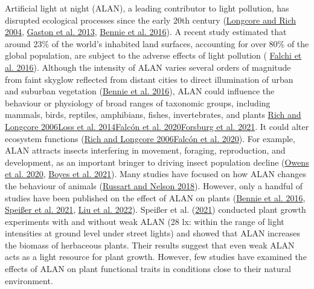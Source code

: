 \documentclass[
  12pt,
  letterpaper,
  DIV=11,
  numbers=noendperiod]{scrartcl}
\providecommand{\DIFaddtex}[1]{{\protect\color{blue}\uwave{#1}}} %
\providecommand{\DIFaddbegin}{} %
\providecommand{\DIFaddend}{} %
\providecommand{\DIFdelbegin}{} %
\providecommand{\DIFdelend}{} %
\providecommand{\DIFadd}[1]{\texorpdfstring{\DIFaddtex{#1}}{#1}} %
\newcommand{\DIFscaledelfig}{0.5}
\newlength{\DIFdelgraphicswidth} %
\newlength{\DIFdelgraphicsheight} %
\newcommand{\DIFaddincludegraphics}[2][]{{\color{blue}\fbox{\DIFOincludegraphics[#1]{#2}}}} %
\newcommand{\DIFdelincludegraphics}[2][]{%
\sbox{\DIFdelgraphicsbox}{\DIFOincludegraphics[#1]{#2}}%
\settoboxwidth{\DIFdelgraphicswidth}{\DIFdelgraphicsbox} %
\settoboxtotalheight{\DIFdelgraphicsheight}{\DIFdelgraphicsbox} %
\scalebox{\DIFscaledelfig}{%
\parbox[b]{\DIFdelgraphicswidth}{\usebox{\DIFdelgraphicsbox}\\[-\baselineskip] \rule{\DIFdelgraphicswidth}{0em}}\llap{\resizebox{\DIFdelgraphicswidth}{\DIFdelgraphicsheight}{%
\setlength{\unitlength}{\DIFdelgraphicswidth}%
\begin{picture}(1,1)%
\thicklines\linethickness{2pt} %
{\color[rgb]{1,0,0}\put(0,0){\framebox(1,1){}}}%
{\color[rgb]{1,0,0}\put(0,0){\line( 1,1){1}}}%
{\color[rgb]{1,0,0}\put(0,1){\line(1,-1){1}}}%
\end{picture}%
}\hspace*{3pt}}} %
} %
\DeclareRobustCommand{\DIFaddbegin}{\DIFOaddbegin \let\includegraphics\DIFaddincludegraphics} %
\DeclareRobustCommand{\DIFaddend}{\DIFOaddend \let\includegraphics\DIFOincludegraphics} %
\DeclareRobustCommand{\DIFdelbegin}{\DIFOdelbegin \let\includegraphics\DIFdelincludegraphics} %
\DeclareRobustCommand{\DIFdelend}{\DIFOaddend \let\includegraphics\DIFOincludegraphics} %
\begin{document}
Artificial light at night (ALAN), a leading contributor to light
pollution, has disrupted ecological processes since the early 20th
century (\protect\hyperlink{ref-Longcore2004}{Longcore and Rich 2004},
\protect\hyperlink{ref-Gaston2013}{Gaston et al. 2013},
\protect\hyperlink{ref-Bennie2016}{Bennie et al. 2016}). A recent study
estimated that around 23\% of the world's inhabited land surfaces,
accounting for over 80\% of the global population, are subject to the
adverse effects of light pollution
(\protect\DIFdelbegin %
\DIFdelend \DIFaddbegin \hyperlink{ref-Falchi2016a}{Falchi et al. 2016}\DIFaddend ). Although the
intensity of ALAN varies several orders of magnitude from faint skyglow
reflected from distant cities to direct illumination of urban and
suburban vegetation (\protect\hyperlink{ref-Bennie2016}{Bennie et al.
2016}), ALAN could influence the behaviour or physiology of broad ranges
of taxonomic groups, including mammals, birds, reptiles, amphibians,
fishes, invertebrates, and plants \DIFaddbegin \DIFadd{(}\protect\hyperlink{ref-Rich2006}{Rich
and Longcore 2006}\DIFadd{, }\protect\hyperlink{ref-Loss2014}{Loss et al. 2014}\DIFadd{,
}\protect\hyperlink{ref-Falcon2020}{Falcón et al. 2020}\DIFadd{,
}\protect\hyperlink{ref-Forsburg2021}{Forsburg et al. 2021}\DIFadd{)}\DIFaddend . It could
alter ecosystem functions (\protect\hyperlink{ref-Rich2006}{Rich and
Longcore 2006}\DIFaddbegin \DIFadd{, }\protect\hyperlink{ref-Falcon2020}{Falcón et al. 2020}\DIFaddend ).
For example, ALAN attracts insects interfering in movement, foraging,
reproduction, and development, as an important bringer to driving insect
population decline (\protect\hyperlink{ref-Owens2020}{Owens et al.
2020}, \protect\hyperlink{ref-Boyes2021}{Boyes et al. 2021}). Many
studies have focused on how ALAN changes the behaviour of animals
(\protect\hyperlink{ref-Russart2018}{Russart and Nelson 2018}). However,
only a handful of studies have been published on the effect of ALAN on
plants (\protect\hyperlink{ref-Bennie2016}{Bennie et al. 2016},
\protect\hyperlink{ref-Speisser2021a}{Speißer et al. 2021},
\protect\hyperlink{ref-Liu2022}{Liu et al. 2022}). Speißer et al.
(\protect\hyperlink{ref-Speisser2021a}{2021}) conducted plant growth
experiments with and without weak ALAN (28 lx: within the range of light
intensities at ground level under street lights) and showed that ALAN
increases the biomass of herbaceous plants. Their results suggest that
even weak ALAN acts as a light resource for plant growth. However, few
studies have examined the effects of ALAN on plant functional traits in
conditions close to their natural environment.
\end{document}
